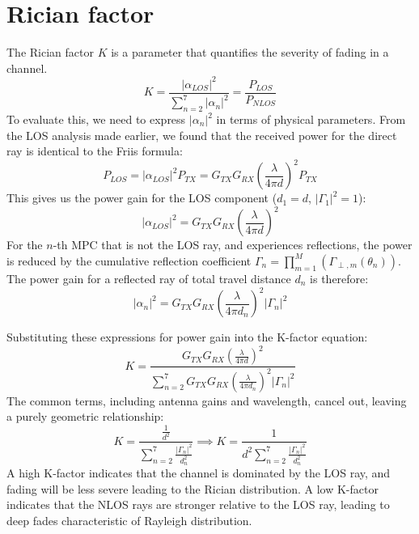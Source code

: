 \section{Rician factor}
The Rician factor $K$ is a parameter that quantifies the severity of fading in a channel. 
\begin{equation}
	K = \frac{|\alpha_{LOS}|^2}{\sum_{n=2}^{7} |\alpha_n|^2} = \frac{P_{LOS}}{P_{NLOS}}
\end{equation}
To evaluate this, we need to express $|\alpha_n|^2$ in terms of physical parameters. From the LOS analysis made earlier, we found that the received power for the direct ray is identical to the Friis formula:
\begin{equation}
	P_{LOS} = |\alpha_{LOS}|^2 P_{TX} = G_{TX} G_{RX} \left( \frac{\lambda}{4\pi d} \right)^2 P_{TX}
\end{equation}
This gives us the power gain for the LOS component ($d_1 = d$, $|\Gamma_1|^2=1$):
\begin{equation}
	|\alpha_{LOS}|^2 = G_{TX} G_{RX} \left( \frac{\lambda}{4\pi d} \right)^2
\end{equation}
For the $n$-th MPC that is not the LOS ray, and experiences reflections, the power is reduced by the cumulative reflection coefficient $\Gamma_n = \prod_{m=1}^{M}(\Gamma_{\perp, m}(\theta_{n}))$. The power gain for a reflected ray of total travel distance $d_n$ is therefore:
\begin{equation}
	|\alpha_n|^2 = G_{TX} G_{RX} \left( \frac{\lambda}{4\pi d_n} \right)^2 |\Gamma_n|^2
\end{equation}

Substituting these expressions for power gain into the K-factor equation:
\begin{equation}
	K = \frac{G_{TX} G_{RX} \left( \frac{\lambda}{4\pi d} \right)^2}{\sum_{n=2}^{7} G_{TX} G_{RX} \left( \frac{\lambda}{4\pi d_n} \right)^2 |\Gamma_n|^2}
\end{equation}
The common terms, including antenna gains and wavelength, cancel out, leaving a purely geometric relationship:
\begin{equation}
	K = \frac{\frac{1}{d^2}}{\sum_{n=2}^{7} \frac{|\Gamma_n|^2}{d_n^2}} \implies \boxed{K =\frac{1}{d^2 \sum_{n=2}^{7} \frac{|\Gamma_n|^2}{d_n^2}}}
\end{equation}
A high K-factor indicates that the channel is dominated by the LOS ray, and fading will be less severe leading to the Rician distribution. A low K-factor indicates that the NLOS rays are stronger relative to the LOS ray, leading to deep fades characteristic of Rayleigh distribution.

